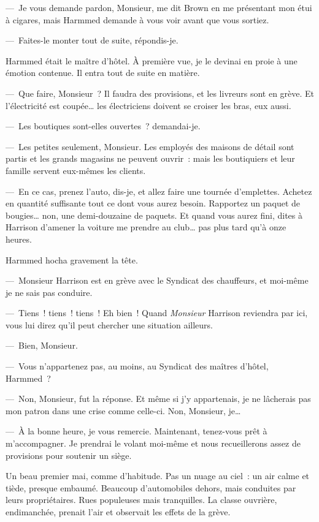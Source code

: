 \documentclass[french,twoside]{book} %
\begin{document}
— Je vous demande pardon, Monsieur, me dit Brown en me présentant mon étui à cigares, mais Harmmed demande à vous voir avant que vous sortiez.\par
— Faites-le monter tout de suite, répondis-je.\par
Harmmed était le maître d’hôtel. À première vue, je le devinai en proie à une émotion contenue. Il entra tout de suite en matière.\par
— Que faire, Monsieur ? Il faudra des provisions, et les livreurs sont en grève. Et l’électricité est coupée… les électriciens doivent se croiser les bras, eux aussi.\par
— Les boutiques sont-elles ouvertes ? demandai-je.\par
— Les petites seulement, Monsieur. Les employés des maisons de détail sont partis et les grands magasins ne peuvent ouvrir : mais les boutiquiers et leur famille servent eux-mêmes les clients.\par
— En ce cas, prenez l’auto, dis-je, et allez faire une tournée d’emplettes. Achetez en quantité suffisante tout ce dont vous aurez besoin. Rapportez un paquet de bougies… non, une demi-douzaine de paquets. Et quand vous aurez fini, dites à Harrison d’amener la voiture me prendre au club… pas plus tard qu’à onze heures.\par
Harmmed hocha gravement la tête.\par
— Monsieur Harrison est en grève avec le Syndicat des chauffeurs, et moi-même je ne sais pas conduire.\par
— Tiens ! tiens ! tiens ! Eh bien ! Quand \emph{Monsieur} Harrison reviendra par ici, vous lui direz qu’il peut chercher une situation ailleurs.\par
— Bien, Monsieur.\par
— Vous n’appartenez pas, au moins, au Syndicat des maîtres d’hôtel, Harmmed ?\par
— Non, Monsieur, fut la réponse. Et même si j’y appartenais, je ne lâcherais pas mon patron dans une crise comme celle-ci. Non, Monsieur, je…\par
— À la bonne heure, je vous remercie. Maintenant, tenez-vous prêt à m’accompagner. Je prendrai le volant moi-même et nous recueillerons assez de provisions pour soutenir un siège.\par
Un beau premier mai, comme d’habitude. Pas un nuage au ciel : un air calme et tiède, presque embaumé. Beaucoup d’automobiles dehors, mais conduites par leurs propriétaires. Rues populeuses mais tranquilles. La classe ouvrière, endimanchée, prenait l’air et observait les effets de la grève.\par
\end{document}
